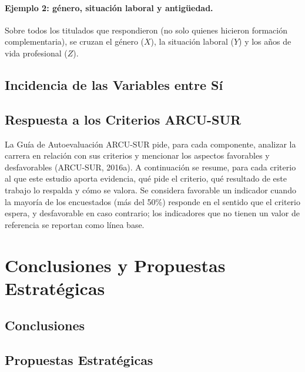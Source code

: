 \documentclass[12pt, a4paper]{article}
\begin{document}
\paragraph{Ejemplo 2: género, situación laboral y antigüedad.} Sobre
todos los titulados que respondieron (no solo quienes hicieron formación
complementaria), se cruzan el género ($X$), la situación laboral ($Y$) y
los años de vida profesional ($Z$).



\subsection{Incidencia de las Variables entre Sí}\label{sec:incidencia}



\subsection{Respuesta a los Criterios ARCU-SUR}\label{sec:criterios}

La Guía de Autoevaluación ARCU-SUR pide, para cada componente, analizar
la carrera en relación con sus criterios y mencionar los aspectos
favorables y desfavorables (ARCU-SUR, 2016a). A continuación se resume,
para cada criterio al que este estudio aporta evidencia, qué pide el
criterio, qué resultado de este trabajo lo respalda y cómo se valora.
Se considera favorable un indicador cuando la mayoría de los
encuestados (más del 50\%) responde en el sentido que el criterio
espera, y desfavorable en caso contrario; los indicadores que no tienen
un valor de referencia se reportan como línea base.



\section{Conclusiones y Propuestas Estratégicas}

\subsection*{Conclusiones}



\subsection*{Propuestas Estratégicas}
\end{document}
